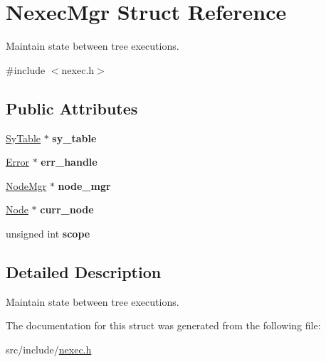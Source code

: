 \hypertarget{struct_nexec_mgr}{}\section{Nexec\+Mgr Struct Reference}
\label{struct_nexec_mgr}


Maintain state between tree executions.  




{\ttfamily \#include $<$nexec.\+h$>$}

\subsection*{Public Attributes}
\begin{DoxyCompactItemize}
\item 
\mbox{\label{struct_nexec_mgr_a52a46cb76bcb1c51fd330097817ba2b3}} 
\mbox{\hyperlink{struct_sy_table}{Sy\+Table}} $\ast$ {\bfseries sy\+\_\+table}
\item 
\mbox{\label{struct_nexec_mgr_ae7f212b8c54fc39b351e4cb7ba48f395}} 
\mbox{\hyperlink{struct_error}{Error}} $\ast$ {\bfseries err\+\_\+handle}
\item 
\mbox{\label{struct_nexec_mgr_a67bb5ce6c22f2f1e324a4823e77d548d}} 
\mbox{\hyperlink{struct_node_mgr}{Node\+Mgr}} $\ast$ {\bfseries node\+\_\+mgr}
\item 
\mbox{\label{struct_nexec_mgr_aa10433dbb92ee9a04c4e8fbd240dac79}} 
\mbox{\hyperlink{struct_node}{Node}} $\ast$ {\bfseries curr\+\_\+node}
\item 
\mbox{\label{struct_nexec_mgr_a46ad1ae7a7d7858d0888c81c6d19474b}} 
unsigned int {\bfseries scope}
\end{DoxyCompactItemize}


\subsection{Detailed Description}
Maintain state between tree executions. 

The documentation for this struct was generated from the following file\+:\begin{DoxyCompactItemize}
\item 
src/include/\mbox{\hyperlink{nexec_8h}{nexec.\+h}}\end{DoxyCompactItemize}
